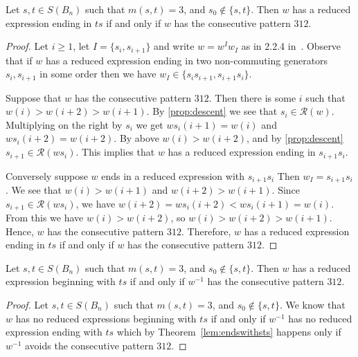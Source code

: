 \begin{lemma}\label{lem:st}
Let $s,t \in S(B_n)$ such that $m(s,t)=3$, and $s_0 \notin \{s,t\}.$ Then $w$ has a reduced expression ending in $ts$ if and only if $w$ has the consecutive pattern $312$.
\begin{proof}
	Let $i \geq 1$, let $I=\{s_i,s_{i+1}\}$ and write $w=w^Iw_I$ as in 2.2.4 in~\cite{Bjorner2005}. Observe that if $w$ has a reduced expression ending in two non-commuting generators $s_i, s_{i+1}$ in some order then we have $w_I \in \{s_is_{i+1}, s_{i+1}s_i\}$.
	
	Suppose that $w$ has the consecutive pattern $312$.  Then there is some $i$ such that $w(i)>w(i+2)>w(i+1)$. By \ref{prop:descent} we see that $s_i \in \mathcal{R}(w)$. Multiplying on the right by $s_i$ we get $ws_i(i+1)=w(i)$ and $ws_i(i+2)=w(i+2)$. By above $w(i)>w(i+2)$, and by \ref{prop:descent} $s_{i+1} \in \mathcal{R}(ws_i)$. This implies that $w$ has a reduced expression ending in $s_{i+1}s_i$. 
	
	Conversely suppose $w$ ends in a reduced expression with $s_{i+1}s_i$ Then $w_I=s_{i+1}s_i$. We see that $w(i)>w(i+1)$ and $w(i+2)>w(i+1)$. Since $s_{i+1} \in \mathcal{R}(ws_i)$, we have $w(i+2)=ws_i(i+2)<ws_i(i+1)=w(i)$. From this we have $w(i)>w(i+2)$, so $w(i)>w(i+2)>w(i+1)$. Hence, $w$ has the consecutive pattern $312$. Therefore, $w$ has a reduced expression ending in $ts$ if and only if $w$ has the consecutive pattern $312$.
\end{proof}
\end{lemma}

\begin{corollary}\label{lem:endswithts}
	Let $s,t \in S(B_n)$ such that $m(s,t)=3$, and $s_0 \notin\{s,t\}$. Then $w$ has a reduced expression beginning with $ts$ if and only if $w^{-1}$ has the consecutive pattern $312$.
	\begin{proof}
		Let $s,t \in S(B_n)$ such that $m(s,t)=3$, and $s_0 \notin\{s,t\}$. We know that $w$ has no reduced expressions beginning with $ts$ if and only if $w^{-1}$ has no reduced expression ending with $ts$ which by Theorem~\ref{lem:endswithsts} happens only if $w^{-1}$ avoids the consecutive pattern $312.$
	\end{proof}
\end{corollary}

